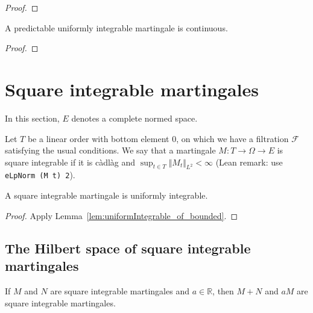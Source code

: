\begin{proof}

\end{proof}


\begin{lemma}\label{lem:Martingale.continuous_of_isStronglyPredictable_of_uniformIntegrable}
A predictable uniformly integrable martingale is continuous.
\end{lemma}

\begin{proof}

\end{proof}


\section{Square integrable martingales}

In this section, $E$ denotes a complete normed space.

\begin{definition}\label{def:IsSquareIntegrable}
  \leanok
Let $T$ be a linear order with bottom element 0, on which we have a filtration $\mathcal{F}$ satisfying the usual conditions.
We say that a martingale $M : T \to \Omega \to E$ is square integrable if it is càdlàg and $\sup_{t \in T} \Vert M_t \Vert_{L^2} < \infty$ (Lean remark: use \texttt{eLpNorm (M t) 2}).
\end{definition}


\begin{lemma}\label{lem:IsSquareIntegrable.uniformIntegrable}
  \leanok
  A square integrable martingale is uniformly integrable.
\end{lemma}

\begin{proof}
  \leanok
Apply Lemma~\ref{lem:uniformIntegrable_of_bounded}.
\end{proof}


\subsection{The Hilbert space of square integrable martingales}


\begin{lemma}\label{lem:IsSquareIntegrable.module}
  \leanok
If $M$ and $N$ are square integrable martingales and $a \in \mathbb{R}$, then $M + N$ and $a M$ are square integrable martingales.
\end{lemma}

